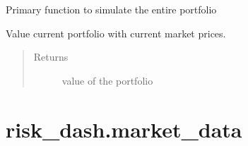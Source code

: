 \documentclass[letterpaper,10pt,english]{sphinxmanual}
\begin{document}
\begin{fulllineitems}
\begin{fulllineitems}
\label{\detokenize{securities:risk_dash.securities.Portfolio.simulate}}
\sphinxAtStartPar
Primary function to simulate the entire portfolio

\end{fulllineitems}


\begin{fulllineitems}
\label{\detokenize{securities:risk_dash.securities.Portfolio.value}}
\sphinxAtStartPar
Value current portfolio with current market prices.
\begin{quote}\begin{description}
\item[{Returns}] \leavevmode
\sphinxAtStartPar
value of the portfolio

\end{description}\end{quote}

\end{fulllineitems}


\end{fulllineitems}



\chapter{risk\_dash.market\_data}
\label{\detokenize{market_data:module-risk_dash.market_data}}\label{\detokenize{market_data:risk-dash-market-data}}\label{\detokenize{market_data:market-data}}\label{\detokenize{market_data::doc}}
\end{document}
